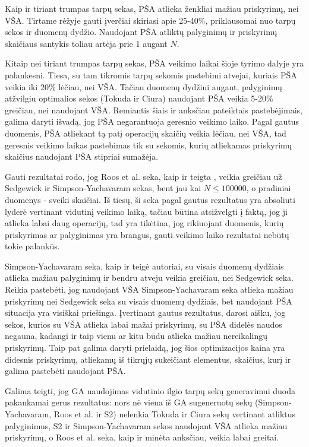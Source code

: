 \documentclass{VUMIFInfKursinis}
\begin{document}
Kaip ir tiriant trumpas tarpų sekas, PŠA atlieka ženkliai mažiau priskyrimų, nei VŠA.
Tirtame rėžyje gauti įverčiai skiriasi apie 25-40\%, priklausomai nuo tarpų sekos ir duomenų dydžio.
Naudojant PŠA atliktų palyginimų ir priskyrimų skaičiaus santykis toliau artėja prie 1 augant $N$.

Kitaip nei tiriant trumpas tarpų sekas, PŠA veikimo laikai šioje tyrimo dalyje yra palankesni.
Tiesa, su tam tikromis tarpų sekomis pastebimi atvejai, kuriais PŠA veikia iki 20\% lėčiau, nei VŠA.
Tačiau duomenų dydžiui augant, palyginimų atžvilgiu optimalios sekos (Tokuda ir Ciura) naudojant PŠA veikia 5-20\% greičiau, nei naudojant VŠA.
Remiantis šiais ir anksčiau pateiktais pastebėjimais, galima daryti išvadą, jog PŠA negarantuoja geresnio veikimo laiko.
Pagal gautus duomenis, PŠA atliekant tą patį operacijų skaičių veikia lėčiau, nei VŠA, tad geresnis veikimo laikas pastebimas tik su sekomis,
kurių atliekamas priskyrimų skaičius naudojant PŠA stipriai sumažėja.

Gauti rezultatai rodo, jog Roos et al. seka, kaip ir teigta \cite{roos2002genetic},
veikia greičiau už Sedgewick ir Simpson-Yachavaram sekas, bent jau kai $N \leq 100000$, o pradiniai duomenys - sveiki skaičiai.
Iš tiesų, ši seka pagal gautus rezultatus yra absoliuti lyderė vertinant vidutinį veikimo laiką, tačiau būtina atsižvelgti į faktą, jog ji atlieka labai daug operacijų,
tad yra tikėtina, jog rikiuojant duomenis, kurių priskyrimas ar palyginimas yra brangus, gauti veikimo laiko rezultatai nebūtų tokie palankūs.

Simpson-Yachavaram seka, kaip ir teigė \cite{simpson1999faster} autoriai, su visais duomenų dydžiais atlieka mažiau palyginimų ir bendru atveju veikia greičiau, nei Sedgewick seka.
Reikia pastebėti, jog naudojant VŠA Simpson-Yachavaram seka atlieka mažiau priskyrimų nei Sedgewick seka su visais duomenų dydžiais, bet
naudojant PŠA situacija yra visiškai priešinga.
Įvertinant gautus rezultatus, darosi aišku, jog sekos, kurios su VŠA atlieka labai mažai priskyrimų, su PŠA didelės naudos negauna, kadangi ir taip
vienu ar kitu būdu atlieka mažiau nereikalingų priskyrimų. Taip pat galima daryti prielaidą, jog šios optimizacijos kaina yra didesnis
priskyrimų, atliekamų iš tikrųjų sukeičiant elementus, skaičius, kurį ir galima pastebėti naudojant PŠA. 

Galima teigti, jog GA naudojimas vidutinio ilgio tarpų sekų generavimui duoda pakankamai gerus rezultatus: nors nė viena iš GA sugeneruotų sekų (Simpson-Yachavaram, Roos et al. ir S2) nelenkia Tokuda ir Ciura sekų
vertinant atliktus palyginimus, S2 ir Simpson-Yachavaram sekos naudojant VŠA atlieka mažiau priskyrimų, o Roos et al. seka, kaip ir minėta anksčiau, veikia labai greitai.
\end{document}
